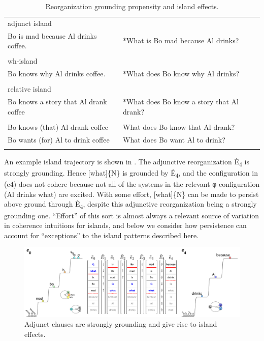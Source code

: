 \begin{table}
\small
\begin{tabularx}{\textwidth}{llQ}
\lsptoprule
{}\\
\midrule
adjunct island \\
{Bo is mad because Al drinks coffee.} & {*What is Bo mad because Al drinks?}\\
\\
wh-island\\
{Bo knows why Al drinks coffee.} & {*What does Bo know why Al drinks?}\\
\\
relative island\\
{Bo knows a story that Al drank coffee} & {*What does Bo know a story that Al drank?}\\
\tablevspace
{}\\
\midrule 
{Bo knows (that) Al drank coffee} & {What does Bo know that Al drank?}\\
{Bo wants (for) Al to drink coffee} & {What does Bo want Al to drink?}\\
\lspbottomrule
\end{tabularx}
\caption{Reorganization grounding propensity and island effects.}\label{tab:7:5}
\end{table}

  An example island trajectory is shown in {}. The adjunctive reorganization Ê\textsubscript{4} is strongly grounding. Hence [what]\{N\} is grounded by Ê\textsubscript{4}, and the configuration in (e4) does not cohere because not all of the systems in the relevant φ-configuration ({\textbar}Al drinks what{\textbar}) are excited. With some effort, [what]\{N\} can be made to persist above ground through Ê\textsubscript{4}, despite this adjunctive reorganization being a strongly grounding one. “Effort” of this sort is almost always a relevant source of variation in coherence intuitions for islands, and below we consider how persistence can account for “exceptions” to the island patterns described here.

  
\begin{figure}
\includegraphics[width=\textwidth]{figures/Tilsen-img163.png}
\caption{Adjunct clauses are strongly grounding and give rise to island effects.}
\label{fig:7:19}
\end{figure}
 


